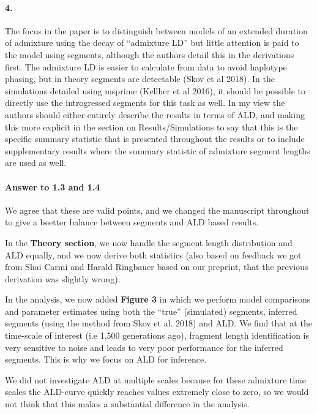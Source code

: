 \documentclass[11pt]{article}
\let\oldparagraph\paragraph
\renewcommand{\paragraph}[1]{\oldparagraph{#1}\mbox{}}
\begin{document}
\paragraph{4.}
The focus in the paper is to distinguish between models of an extended duration of admixture using the decay of “admixture LD” but little attention is paid to the model using segments, although the authors detail this in the derivations first. The admixture LD is easier to calculate from data to avoid haplotype phasing, but in theory segments are detectable (Skov et al 2018). In the simulations detailed using msprime (Kellher et al 2016), it should be possible to directly use the introgressed segments for this task as well. In my view the authors should either entirely describe the results in terms of ALD, and making this more explicit in the section on Results/Simulations to say that this is the specific summary statistic that is presented throughout the results or to include supplementary results where the summary statistic of admixture segment lengths are used as well. 



\paragraph{Answer to 1.3 and 1.4}
We agree that these are valid points, and we changed the manuscript throughout to give a beetter balance between segments and ALD based results. 

In the \textbf{Theory section}, we now handle the segment length distribution and ALD equally, and we now derive both statistics (also based on feedback we got from Shai Carmi and Harald Ringbauer based on our preprint, that the previous derivation was slightly wrong).

In the analysis, we now added \textbf{Figure 3} in which we perform model comparisons and parameter estimates using both the ``true'' (simulated) segments, inferred segments (using the method from Skov et al. 2018) and ALD. We find that at the time-scale of interest (i.e 1,500 generations ago), fragment length identification is very sensitive to noise and leads to very poor performance for the inferred segments. This is why we focus on ALD for inference. 

We did not investigate ALD at multiple scales because for these admixture time scales the ALD-curve quickly reaches values extremely close to zero, so we would not think that this makes a substantial difference in the analysis. 
\end{document}
